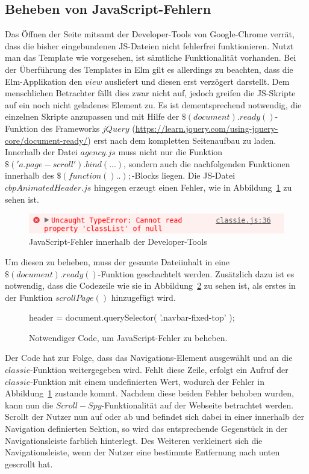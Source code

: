 \subsection{Beheben von JavaScript-Fehlern}
\label{sec:javascript-errors}
Das Öffnen der Seite mitsamt der Developer-Tools von Google-Chrome verrät, dass die bisher eingebundenen \ac{JS}-Dateien nicht fehlerfrei funktionieren. Nutzt man das Template wie vorgesehen, ist sämtliche Funktionalität vorhanden. Bei der Überführung des Templates in Elm gilt es allerdings zu beachten, dass die Elm-Applikation den $view$ ausliefert und diesen erst verzögert darstellt. Dem menschlichen Betrachter fällt dies zwar nicht auf, jedoch greifen die \ac{JS}-Skripte auf ein noch nicht geladenes Element zu. Es ist dementsprechend notwendig, die einzelnen Skripte anzupassen und mit Hilfe der $\$(document).ready()$-Funktion des Frameworks $jQuery$ (\url{https://learn.jquery.com/using-jquery-core/document-ready/}) erst nach dem kompletten Seitenaufbau zu laden.
Innerhalb der Datei $agency.js$ muss nicht nur die Funktion $\$('a.page-scroll').bind(...)$, sondern auch die nachfolgenden Funktionen innerhalb des $\$(function(){..});$-Blocks liegen. Die \ac{JS}-Datei $cbpAnimatedHeader.js$ hingegen erzeugt einen Fehler, wie in Abbildung~\ref{fig:js-classie-error} zu sehen ist.
\begin{figure}[h]
\centering
\includegraphics[scale=0.4]{img/error-javascript-classie.png}
\caption{JavaScript-Fehler innerhalb der Developer-Tools}\label{fig:js-classie-error}
\end{figure}
Um diesen zu beheben, muss der gesamte Dateiinhalt in eine $\$(document).ready()$-Funktion geschachtelt werden. Zusätzlich dazu ist es notwendig, dass die Codezeile wie sie in Abbildung~\ref{fig:code-to-add} zu sehen ist, als erstes in der Funktion $scrollPage()$ hinzugefügt wird.
\begin{figure}[h]
\centering
header = document.querySelector( '.navbar-fixed-top' );
\caption{Notwendiger Code, um JavaScript-Fehler zu beheben.}\label{fig:code-to-add}
\end{figure}
Der Code hat zur Folge, dass das Navigations-Element ausgewählt und an die $classie$-Funktion weitergegeben wird. Fehlt diese Zeile, erfolgt ein Aufruf der $classie$-Funktion mit einem undefinierten Wert, wodurch der Fehler in Abbildung~\ref{fig:js-classie-error} zustande kommt. Nachdem diese beiden Fehler behoben wurden, kann nun die $Scroll-Spy$-Funktionalität auf der Webseite betrachtet werden. Scrollt der Nutzer nun auf oder ab und befindet sich dabei in einer innerhalb der Navigation definierten Sektion, so wird das entsprechende Gegenstück in der Navigationsleiste farblich hinterlegt. Des Weiteren verkleinert sich die Navigationsleiste, wenn der Nutzer eine bestimmte Entfernung nach unten gescrollt hat.


